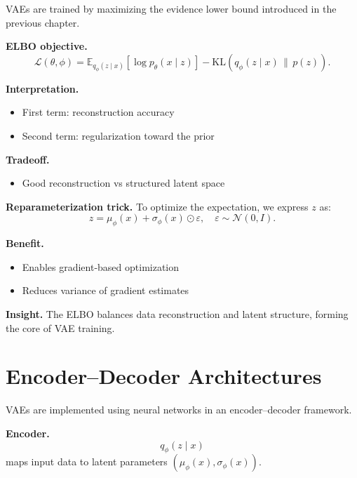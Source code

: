 VAEs are trained by maximizing the evidence lower bound introduced in the previous chapter.

\medskip

\noindent
\textbf{ELBO objective.}
\[
\mathcal{L}(\theta, \phi)
=
\mathbb{E}_{q_\phi(z \mid x)}[\log p_\theta(x \mid z)]
-
\mathrm{KL}(q_\phi(z \mid x) \,\|\, p(z)).
\]

\medskip

\noindent
\textbf{Interpretation.}
\begin{itemize}
    \item First term: reconstruction accuracy
    \item Second term: regularization toward the prior
\end{itemize}

\medskip

\noindent
\textbf{Tradeoff.}
\begin{itemize}
    \item Good reconstruction vs structured latent space
\end{itemize}

\medskip

\noindent
\textbf{Reparameterization trick.}  
To optimize the expectation, we express $z$ as:
\[
z = \mu_\phi(x) + \sigma_\phi(x) \odot \varepsilon, \quad \varepsilon \sim \mathcal{N}(0, I).
\]

\medskip

\noindent
\textbf{Benefit.}
\begin{itemize}
    \item Enables gradient-based optimization
    \item Reduces variance of gradient estimates
\end{itemize}

\medskip

\noindent
\textbf{Insight.}  
The ELBO balances data reconstruction and latent structure, forming the core of VAE training.

\section{Encoder--Decoder Architectures}

VAEs are implemented using neural networks in an encoder--decoder framework.

\medskip

\noindent
\textbf{Encoder.}
\[
q_\phi(z \mid x)
\]
maps input data to latent parameters $(\mu_\phi(x), \sigma_\phi(x))$.

